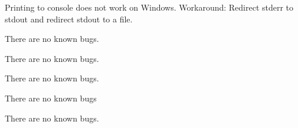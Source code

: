 
\begin{DoxyRefList}
\item[\label{bug__bug000001}%
\Hypertarget{bug__bug000001}%
File \hyperlink{debug_8h}{debug.h} ]Printing to console does not work on Windows. Workaround\+: Redirect stderr to stdout and redirect stdout to a file. 
\item[\label{bug__bug000002}%
\Hypertarget{bug__bug000002}%
File \hyperlink{defines_8h}{defines.h} ]There are no known bugs. 
\item[\label{bug__bug000003}%
\Hypertarget{bug__bug000003}%
Namespace \hyperlink{namespacehelper}{helper} ]There are no known bugs.  
\item[\label{bug__bug000004}%
\Hypertarget{bug__bug000004}%
Class \hyperlink{classMotor}{Motor} ]There are no known bugs. 
\item[\label{bug__bug000005}%
\Hypertarget{bug__bug000005}%
Class \hyperlink{classUDPlistener}{U\+D\+Plistener} ]There are no known bugs 
\item[\label{bug__bug000006}%
\Hypertarget{bug__bug000006}%
File \hyperlink{version_8h}{version.h} ]There are no known bugs.
\end{DoxyRefList}